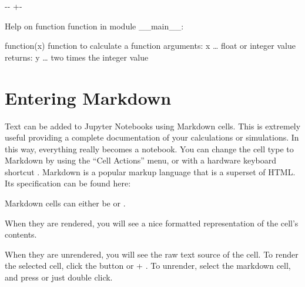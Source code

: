 \documentclass[letterpaper,10pt,english]{sphinxmanual}
\newlength\nbsphinxcodecellspacing
\begin{document}
{
\begin{sphinxVerbatim}[commandchars=\\\{\}]
\llap{\color{nbsphinxin}[3]:\,\hspace{\fboxrule}\hspace{\fboxsep}}
\end{sphinxVerbatim}
}

{

\kern-\sphinxverbatimsmallskipamount\kern-\baselineskip
\kern+\FrameHeightAdjust\kern-\fboxrule
\vspace{\nbsphinxcodecellspacing}

\begin{sphinxVerbatim}[commandchars=\\\{\}]
Help on function function in module \_\_main\_\_:

function(x)
    function to calculate a function
    arguments:
        x {\ldots} float or integer value
    returns:
        y {\ldots} two times the integer value

\end{sphinxVerbatim}
}


\section{Entering Markdown}
\label{\detokenize{notebooks/Intro/EditCells:Entering-Markdown}}
Text can be added to Jupyter Notebooks using Markdown cells. This is extremely useful providing a complete documentation of your calculations or simulations. In this way, everything really becomes a notebook. You can change the cell type to Markdown by using the “Cell Actions” menu, or with a hardware keyboard shortcut . Markdown is a popular markup language that is a superset of HTML. Its specification can be found here:


Markdown cells can either be  or .

When they are rendered, you will see a nice formatted representation of the cell’s contents.

When they are unrendered, you will see the raw text source of the cell. To render the selected cell, click the  button or + . To unrender, select the markdown cell, and press  or just double click.
\end{document}
